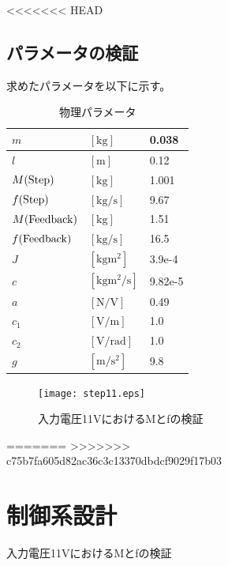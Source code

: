 \documentclass[a4j,11pt,twoside]{ujbook}
\begin{document}
\begin{figure}[htbp]
\begin{center}
<<<<<<< HEAD
\section{パラメータの検証}
求めたパラメータを以下に示す。

\begin{table}[hbtp]
	\begin{center}
		\caption{物理パラメータ}
		\medskip
		\begin{tabular}{|ll|l|} \hline
			$m$ & $[\mathrm{kg}]$ & 0.038 \\ \hline
			$l$ & $[\mathrm{m}]$ & 0.12 \\ \hline
			$M(\rm{Step})$ & $[\mathrm{kg}]$ & 1.001 \\ \hline
			$f(\rm{Step})$ & $[\mathrm{kg/s}]$ & 9.67 \\ \hline
			$M(\rm{Feedback})$ & $[\mathrm{kg}]$ & 1.51 \\ \hline
			$f(\rm{Feedback})$ & $[\mathrm{kg/s}]$ & 16.5 \\ \hline
			$J$ & $[\mathrm{kgm^2}]$ & 3.9e-4 \\ \hline
			$c$ & $[\mathrm{kgm^2/s}]$ & 9.82e-5 \\ \hline
			$a$ & $[\mathrm{N/V}]$ & 0.49 \\ \hline
			$c_1$ & $[\mathrm{V/m}]$ & 1.0 \\ \hline
			$c_2$ & $[\mathrm{V/rad}]$ & 1.0 \\ \hline
			$g$ & $[\mathrm{m/s^2}]$ & 9.8 \\ \hline
		\end{tabular}
	\end{center}
\end{table}

\begin{figure}[htbp]
	\begin{center}
		\texttt{[image: step11.eps]}
		\caption{入力電圧11VにおけるMとfの検証}
		\label{fig:入力電圧11VにおけるMとfの検証}
	\end{center}
\end{figure}

=======
>>>>>>> c75b7fa605d82ac36c3c13370dbdcf9029f17b03
\chapter{制御系設計}

\end{center}
\end{figure}
\end{document}
